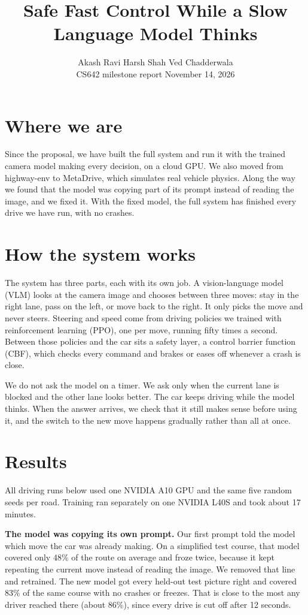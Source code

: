 \documentclass[11pt]{article}
\title{\vspace{-1.4em}Safe Fast Control While a Slow Language Model Thinks}
\author{Akash Ravi \quad Harsh Shah \quad Ved Chadderwala\\
\small CS642 milestone report \quad November 14, 2026}
\date{}
\begin{document}
\maketitle
\vspace{-2em}

\section{Where we are}
Since the proposal, we have built the full system and run it with the trained camera model making every decision, on a cloud GPU. We also moved from highway-env to MetaDrive, which simulates real vehicle physics. Along the way we found that the model was copying part of its prompt instead of reading the image, and we fixed it. With the fixed model, the full system has finished every drive we have run, with no crashes.

\section{How the system works}
The system has three parts, each with its own job. A vision-language model (VLM) looks at the camera image and chooses between three moves: stay in the right lane, pass on the left, or move back to the right. It only picks the move and never steers. Steering and speed come from driving policies we trained with reinforcement learning (PPO), one per move, running fifty times a second. Between those policies and the car sits a safety layer, a control barrier function (CBF), which checks every command and brakes or eases off whenever a crash is close.

We do not ask the model on a timer. We ask only when the current lane is blocked and the other lane looks better. The car keeps driving while the model thinks. When the answer arrives, we check that it still makes sense before using it, and the switch to the new move happens gradually rather than all at once.

\section{Results}
All driving runs below used one NVIDIA A10 GPU and the same five random seeds per road. Training ran separately on one NVIDIA L40S and took about 17 minutes.

\textbf{The model was copying its own prompt.} Our first prompt told the model which move the car was already making. On a simplified test course, that model covered only 48\% of the route on average and froze twice, because it kept repeating the current move instead of reading the image. We removed that line and retrained. The new model got every held-out test picture right and covered 83\% of the same course with no crashes or freezes. That is close to the most any driver reached there (about 86\%), since every drive is cut off after 12 seconds.
\end{document}
